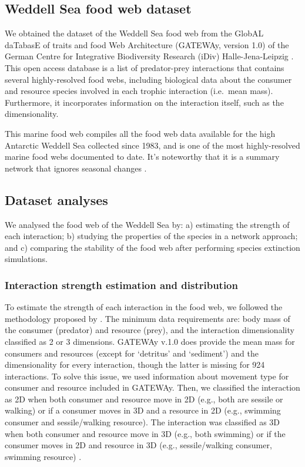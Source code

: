 \documentclass[gc, manuscript]{copernicus}
\begin{document}
\subsection{Weddell Sea food web dataset}

We obtained the dataset of the Weddell Sea food web from the GlobAL
daTabasE of traits and food Web Architecture (GATEWAy, version 1.0) of
the German Centre for Integrative Biodiversity Research (iDiv)
Halle-Jena-Leipzig \citep{Brose2018}. This open access database is a
list of predator-prey interactions that contains several highly-resolved
food webs, including biological data about the consumer and resource
species involved in each trophic interaction (i.e.~mean mass).
Furthermore, it incorporates information on the interaction itself, such
as the dimensionality.

This marine food web compiles all the food web data available for the
high Antarctic Weddell Sea collected since 1983, and is one of the most
highly-resolved marine food webs documented to date. It's noteworthy
that it is a summary network that ignores seasonal changes
\citep{Jacob2011}.

\subsection{Dataset analyses}

We analysed the food web of the Weddell Sea by: a) estimating the
strength of each interaction; b) studying the properties of the species
in a network approach; and c) comparing the stability of the food web
after performing species extinction simulations.

\subsubsection{Interaction strength estimation and distribution}

To estimate the strength of each interaction in the food web, we
followed the methodology proposed by \citet{Pawar2012}. The minimum data
requirements are: body mass of the consumer (predator) and resource
(prey), and the interaction dimensionality classified as 2 or 3
dimensions. GATEWAy v.1.0 does provide the mean mass for consumers and
resources (except for `detritus' and `sediment') and the dimensionality
for every interaction, though the latter is missing for 924
interactions. To solve this issue, we used information about movement
type for consumer and resource included in GATEWAy. Then, we classified
the interaction as 2D when both consumer and resource move in 2D (e.g.,
both are sessile or walking) or if a consumer moves in 3D and a resource
in 2D (e.g., swimming consumer and sessile/walking resource). The
interaction was classified as 3D when both consumer and resource move in
3D (e.g., both swimming) or if the consumer moves in 2D and resource in
3D (e.g., sessile/walking consumer, swimming resource)
\citep{Pawar2012}.
\end{document}
